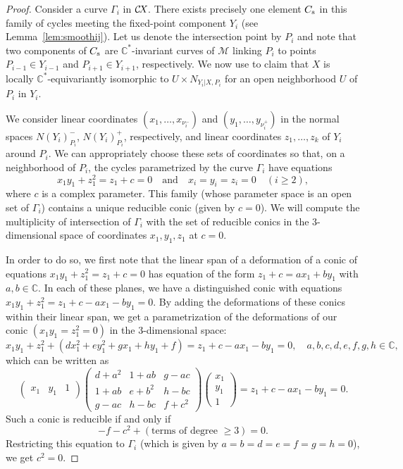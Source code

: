 \documentclass[10pt,a4paper]{article}
\numberwithin{equation}{section}
\theoremstyle{definition}
\theoremstyle{remark}
\def\C{{\mathbb C}}
\def\cM{{\mathcal M}}
\def\CX{\mathcal{C}\!X\hspace{-0.5pt}}
\begin{document}
\begin{proof}
Consider a curve $\Gamma_i$ in $\CX$. There exists precisely one element $C_{\mbox{\scriptsize{s}}}$ in this family of cycles meeting the fixed-point component $Y_i$ (see Lemma~\ref{lem:smoothij}). Let us denote the intersection point by $P_i$ and note that two components of $C_{\mbox{\scriptsize{s}}}$ are $\C^*$-invariant curves of $\cM$ linking $P_i$ to points $P_{i-1}\in Y_{i-1}$ and  $P_{i+1}\in Y_{i+1}$, respectively. We now use \cite[Theorem~2.5]{BB} to claim that $X$ is locally $\C^*$-equivariantly isomorphic to $U\times {N_{Y_i|X,P_i}}$ for an open neighborhood $U$ of $P_i$ in $Y_i$. 

We consider linear coordinates $(x_1,\dots,x_{\nu_i^-})$ and $(y_1,\dots,y_{\nu_i^+})$  in the normal spaces $N(Y_i)_{P_i}^-$, $N(Y_i)^+_{P_i}$, respectively, and linear coordinates $z_1,\dots,z_k$  of $Y_i$ around $P_i$. We can appropriately choose these sets of coordinates so that, on a neighborhood of $P_i$, the cycles parametrized by the curve $\Gamma_i$ have equations
\[
x_1y_1+z_1^2=z_1+c=0\quad\text{and}\quad x_i=y_i=z_i=0 \quad (i\geq 2),
\] 
where $c$ is a complex parameter. This family (whose parameter space is an open set of $\Gamma_i$) contains a unique reducible conic (given by $c=0$). We will compute the multiplicity of intersection of $\Gamma_i$ with the set of reducible conics in the $3$-dimensional space of coordinates $x_1,y_1,z_1$ at $c=0$.

 In order to do so, we first note that the linear span of a deformation of a conic of equations $x_1y_1+z_1^2=z_1+c=0$ has equation of the form $z_1+c=ax_1+by_1$ with $a,b\in \C$. In each of these planes, we have a distinguished conic with equations $x_1y_1+z_1^2=z_1+c-ax_1-by_1=0$. By adding the deformations of these conics within their linear span, we get a parametrization of the deformations of our conic $(x_1y_1=z_1^2=0)$ in the $3$-dimensional space:
\[
x_1y_1+z_1^2+\left(dx_1^2+ey_1^2+gx_1+hy_1+f\right)=z_1+c-ax_1-by_1=0,\quad a,b,c,d,e,f,g,h\in \C,
\]
which can be written as 
\[
\begin{pmatrix}x_1&y_1&1\end{pmatrix}
\begin{pmatrix}
d+a^2 & 1+ab & g-ac\\
1+ab & e+b^2 & h-bc\\
g-ac & h-bc & f+c^2
\end{pmatrix}
\begin{pmatrix}x_1\\y_1\\1\end{pmatrix}=z_1+c-ax_1-by_1=0.\]
Such a conic is reducible if and only if
\[
-f-c^2+(\mbox{terms of degree $\geq 3$})=0. 
\]
Restricting this equation to  $\Gamma_i$ (which is given by $a=b=d=e=f=g=h=0$), we get $c^2=0$.
\end{proof}
\end{document}
